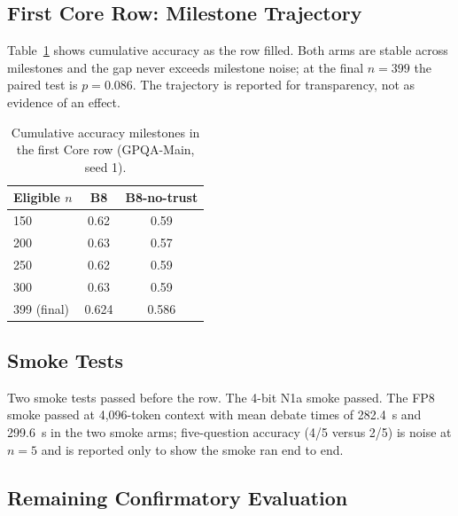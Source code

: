 \documentclass[a4paper,fleqn]{cas-sc}
\begin{document}
\subsection{First Core Row: Milestone Trajectory}

Table~\ref{tab:milestones} shows cumulative accuracy as the row filled. Both arms are stable across milestones and the gap never exceeds milestone noise; at the final $n=399$ the paired test is $p=0.086$. The trajectory is reported for transparency, not as evidence of an effect.

\begin{table}[htbp]
  \centering
  \caption{Cumulative accuracy milestones in the first Core row (GPQA-Main, seed 1).}
  \label{tab:milestones}
  \begin{tabular}{lcc}
    \toprule
    Eligible $n$ & B8 & B8-no-trust \\
    \midrule
    150 & 0.62 & 0.59 \\
    200 & 0.63 & 0.57 \\
    250 & 0.62 & 0.59 \\
    300 & 0.63 & 0.59 \\
    399 (final) & 0.624 & 0.586 \\
    \bottomrule
  \end{tabular}
\end{table}

\subsection{Smoke Tests}

Two smoke tests passed before the row. The 4-bit N1a smoke passed. The FP8 smoke passed at 4,096-token context with mean debate times of 282.4~s and 299.6~s in the two smoke arms; five-question accuracy (4/5 versus 2/5) is noise at $n=5$ and is reported only to show the smoke ran end to end.

\subsection{Remaining Confirmatory Evaluation}
\end{document}

